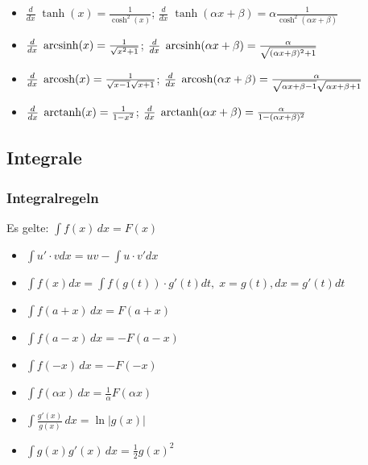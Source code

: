 \begin{itemize}[leftmargin=*]
	\item $\frac{d}{dx}\; \tanh(x) = \frac{1}{\cosh^2(x)}$;
	$\frac{d}{dx}\; \tanh(\alpha x + \beta) = \alpha
	\frac{1}{\cosh^2(\alpha x + \beta)}$
	\item $\frac{d}{dx}\; \operatorname{arcsinh}(x) = \frac{1}{\sqrt{x^2 + 1}}$;
	$\frac{d}{dx}\; \operatorname{arcsinh}(\alpha x + \beta) = \frac{\alpha}{\sqrt{(\alpha x
	+ \beta)^2 + 1}}$
	\item $\frac{d}{dx}\; \operatorname{arcosh}(x) = \frac{1}{\sqrt{x-1} \sqrt{x + 1}}$;
	$\frac{d}{dx}\; \operatorname{arcosh}(\alpha x + \beta) = \frac{\alpha}{\sqrt{\alpha x + \beta
	- 1} \sqrt{\alpha x + \beta + 1}}$
	\item $\frac{d}{dx}\; \operatorname{arctanh}(x) = \frac{1}{1-x^2}$;
	$\frac{d}{dx}\; \operatorname{arctanh}(\alpha x + \beta) = \frac{\alpha}{1 - (\alpha x +
	\beta)^2}$
\end{itemize}

\subsection{Integrale}
\subsubsection{Integralregeln}
Es gelte: $\int f(x) \, dx = F(x)$
\begin{itemize}[leftmargin=*]
	\item $\int u'\cdot v dx = uv - \int u \cdot v' dx$
	\item $\int f(x) dx = \int f(g(t)) \cdot g'(t) dt, \; x=g(t), dx = g'(t) dt$\newline\hfill
	\item $\int f(a + x) \,dx = F(a + x)$
	\item $\int f(a - x) \,dx = -F(a-x)$
	\item $\int f(-x) \,dx = -F(-x)$
	\item $\int f(\alpha x) \,dx = \frac{1}{\alpha}F(\alpha x)$
	\item $\int \frac{g'(x)}{g(x)} \, dx = \ln|g(x)|$
	\item $\int g(x)g'(x) \, dx = \frac{1}{2}g(x)^2$
\end{itemize}

